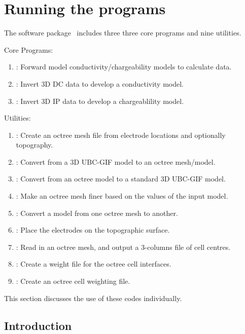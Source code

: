 \section{Running the programs}

The software package \programName ~includes three three core programs and nine utilities.

Core Programs:
\begin{enumerate}
\item {}: Forward model conductivity/chargeability models
to calculate data.
\item {}: Invert 3D DC data to develop a conductivity model.
\item {}: Invert 3D IP data to develop a chargeablility model.
\end{enumerate}

Utilities:
\begin{enumerate}
\item {}: Create an octree mesh file from electrode locations and optionally
topography.
\item {}: Convert from a 3D UBC-GIF model to an octree mesh/model.
\item {}: Convert from an octree model to a standard 3D UBC-GIF model.
\item {}: Make an octree mesh finer based on the values of the input model.
\item {}: Convert a model from one octree mesh to another.
\item {}: Place the electrodes on the topographic surface.
\item {}: Read in an octree mesh, and output a 3-columns file of cell centres.
\item {}: Create a weight file for the octree cell interfaces.
\item {}: Create an octree cell weighting file.
\end{enumerate}
This section discusses the use of these codes individually.

\subsection{Introduction}

